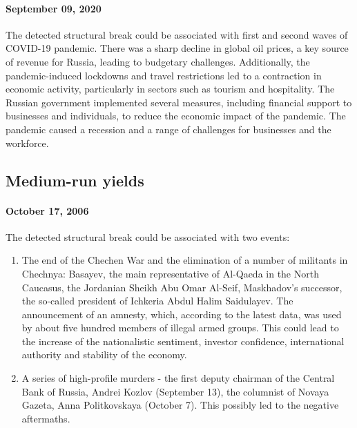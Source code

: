             \paragraph{September 09, 2020} The detected structural break could be associated with first and second waves of COVID-19 
            pandemic. There was a sharp decline in global oil prices, a key source of revenue for Russia, leading to budgetary challenges. 
            Additionally, the pandemic-induced lockdowns and travel restrictions led to a contraction in economic activity, particularly 
            in sectors such as tourism and hospitality. The Russian government implemented several measures, including financial support 
            to businesses and individuals, to reduce the economic impact of the pandemic. The pandemic caused a recession and a range of 
            challenges for businesses and the workforce.

    \subsection{Medium-run yields}
            \paragraph{October 17, 2006} The detected structural break could be associated with two events:
            \begin{enumerate}
                \item The end of the Chechen War and the elimination of a number of militants in Chechnya: Basayev, the main representative 
                of Al-Qaeda in the North Caucasus, the Jordanian Sheikh Abu Omar Al-Seif, Maskhadov's successor, the so-called president 
                of Ichkeria Abdul Halim Saidulayev. The announcement of an amnesty, which, according to the latest data, was used by about 
                five hundred members of illegal armed groups. This could lead to the increase of the nationalistic sentiment, investor confidence, 
                international authority and stability of the economy.
                \item A series of high-profile murders - the first deputy chairman of the Central Bank of Russia, Andrei Kozlov (September 13), 
                the columnist of Novaya Gazeta, Anna Politkovskaya (October 7). This possibly led to the negative aftermaths.
            \end{enumerate}
